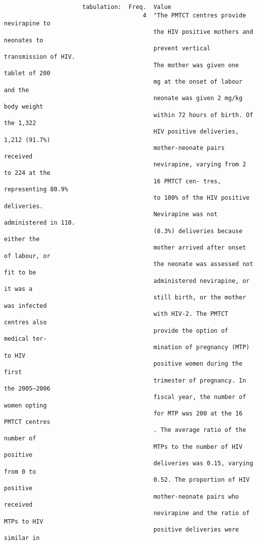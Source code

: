 \documentclass{article}
\begin{document}
\begin{verbatim}
                      tabulation:  Freq.  Value
                                       4  "The PMTCT centres provide nevirapine to
                                          the HIV positive mothers and neonates to
                                          prevent vertical transmission of HIV.
                                          The mother was given one tablet of 200
                                          mg at the onset of labour and the
                                          neonate was given 2 mg/kg body weight
                                          within 72 hours of birth. Of the 1,322
                                          HIV positive deliveries, 1,212 (91.7%)
                                          mother-neonate pairs received
                                          nevirapine, varying from 2 to 224 at the
                                          16 PMTCT cen- tres, representing 80.9%
                                          to 100% of the HIV positive deliveries.
                                          Nevirapine was not administered in 110.
                                          (8.3%) deliveries because either the
                                          mother arrived after onset of labour, or
                                          the neonate was assessed not fit to be
                                          administered nevirapine, or it was a
                                          still birth, or the mother was infected
                                          with HIV-2. The PMTCT centres also
                                          provide the option of medical ter-
                                          mination of pregnancy (MTP) to HIV
                                          positive women during the first
                                          trimester of pregnancy. In the 2005–2006
                                          fiscal year, the number of women opting
                                          for MTP was 200 at the 16 PMTCT centres
                                          . The average ratio of the number of
                                          MTPs to the number of HIV positive
                                          deliveries was 0.15, varying from 0 to
                                          0.52. The proportion of HIV positive
                                          mother-neonate pairs who received
                                          nevirapine and the ratio of MTPs to HIV
                                          positive deliveries were similar in

\end{verbatim}
\end{document}
